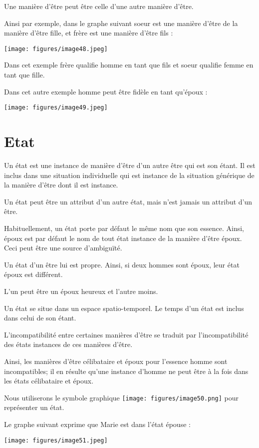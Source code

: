 \documentclass[a4paper, 12pt, openright, french]{book}
\begin{document}
Une manière d'être peut être celle d'une
autre manière d'être.

Ainsi par exemple, dans le graphe suivant soeur est une manière
d'être de la manière d'être fille, et
frère est une manière d'être fils :

\texttt{[image: figures/image48.jpeg]}

Dans cet exemple frère qualifie homme en tant que fils et soeur qualifie
femme en tant que fille.

Dans cet autre exemple homme peut être fidèle en tant
qu'époux :

\texttt{[image: figures/image49.jpeg]}

\chapter{Etat}

Un état est une instance de manière d'être
d'un autre être qui est son étant. Il est inclus dans
une situation individuelle qui est instance de la situation générique de
la manière d'être dont il est instance.

Un état peut être un attribut d'un autre état, mais
n'est jamais un attribut d'un être.

Habituellement, un état porte par défaut le même nom que son essence.
Ainsi, époux est par défaut le nom de tout état instance de la manière
d'être époux. Ceci peut être une source
d'ambiguïté.

Un état d'un être lui est propre. Ainsi, si deux hommes
sont époux, leur état époux est différent.

L'un peut être un époux heureux et
l'autre moins.

Un état se situe dans un espace spatio-temporel. Le temps
d'un état est inclus dans celui de son étant.

L'incompatibilité entre certaines manières
d'être se traduit par l'incompatibilité
des états instances de ces manières d'être.

Ainsi, les manières d'être célibataire et époux pour
l'essence homme sont incompatibles; il en résulte
qu'une instance d'homme ne peut être à
la fois dans les états célibataire et époux.

Nous utiliserons le symbole graphique
\texttt{[image: figures/image50.png]}
pour représenter un état.

Le graphe suivant exprime que Marie est dans l'état
épouse :

\texttt{[image: figures/image51.jpeg]}
\end{document}

